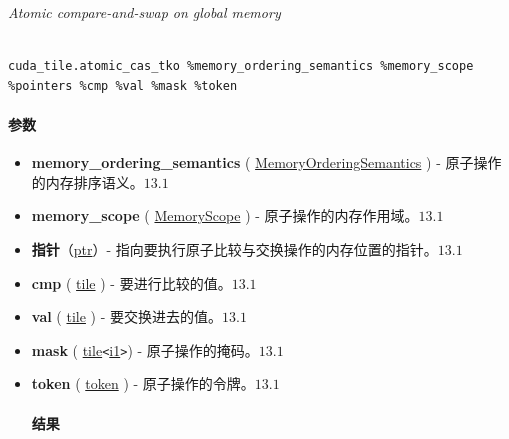 \documentclass{article}
\begin{document}
\textit{Atomic compare-and-swap on global memory}




\begin{lstlisting}

cuda_tile.atomic_cas_tko %memory_ordering_semantics %memory_scope %pointers %cmp %val %mask %token

\end{lstlisting}



\paragraph{参数}


\begin{itemize}
\item \textbf{memory\_ordering\_semantics} ( \href{https://docs.nvidia.com/cuda/tile-ir/latest/sections/operations.html#op-attribute-cuda-tile-atomic-cas-tko-memoryorderingsemantics-attr}{MemoryOrderingSemantics} ) - 原子操作的内存排序语义。$\boxed{13.1}$
\item \textbf{memory\_scope} ( \href{https://docs.nvidia.com/cuda/tile-ir/latest/sections/operations.html#op-attribute-cuda-tile-atomic-cas-tko-memoryscope-attr}{MemoryScope} ) - 原子操作的内存作用域。$\boxed{13.1}$
\item \textbf{指针}（\href{https://docs.nvidia.com/cuda/tile-ir/latest/sections/types.html#type-ptr}{ptr}）- 指向要执行原子比较与交换操作的内存位置的指针。$\boxed{13.1}$
\item \textbf{cmp} ( \href{https://docs.nvidia.com/cuda/tile-ir/latest/sections/types.html#type-tile}{tile} ) - 要进行比较的值。$\boxed{13.1}$
\item \textbf{val} ( \href{https://docs.nvidia.com/cuda/tile-ir/latest/sections/types.html#type-tile}{tile} ) - 要交换进去的值。$\boxed{13.1}$
\item \textbf{mask} ( \href{https://docs.nvidia.com/cuda/tile-ir/latest/sections/types.html#type-tile}{tile}\texttt{<}\href{https://docs.nvidia.com/cuda/tile-ir/latest/sections/types.html#subsection-element-types}{i1}\texttt{>}) - 原子操作的掩码。$\boxed{13.1}$
\item \textbf{token} ( \href{https://docs.nvidia.com/cuda/tile-ir/latest/sections/operations.html#type-token}{token} ) - 原子操作的令牌。$\boxed{13.1}$




\paragraph{结果}



\end{itemize}
\end{document}

